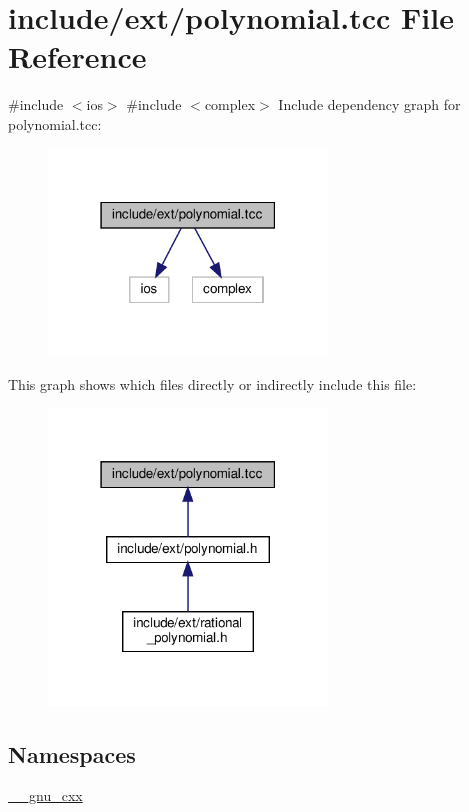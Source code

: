 \hypertarget{polynomial_8tcc}{}\section{include/ext/polynomial.tcc File Reference}
\label{polynomial_8tcc}
{\ttfamily \#include $<$ios$>$}\newline
{\ttfamily \#include $<$complex$>$}\newline
Include dependency graph for polynomial.\+tcc\+:
\nopagebreak
\begin{figure}[H]
\begin{center}
\leavevmode
\includegraphics[width=210pt]{polynomial_8tcc__incl}
\end{center}
\end{figure}
This graph shows which files directly or indirectly include this file\+:
\nopagebreak
\begin{figure}[H]
\begin{center}
\leavevmode
\includegraphics[width=210pt]{polynomial_8tcc__dep__incl}
\end{center}
\end{figure}
\subsection*{Namespaces}
\begin{DoxyCompactItemize}
\item 
 \hyperlink{namespace____gnu__cxx}{\+\_\+\+\_\+gnu\+\_\+cxx}
\end{DoxyCompactItemize}
